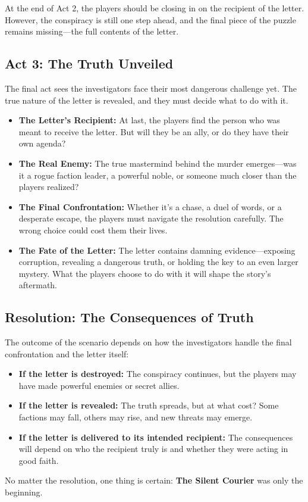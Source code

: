 \noindent
At the end of Act 2, the players should be closing in on the recipient of the letter. However, the conspiracy is still one step ahead, and the final piece of the puzzle remains missing—the full contents of the letter.

\subsection{Act 3: The Truth Unveiled}  
The final act sees the investigators face their most dangerous challenge yet. The true nature of the letter is revealed, and they must decide what to do with it.

\begin{WyrdExplanation}
    \begin{itemize}
        \item \textbf{The Letter’s Recipient:} At last, the players find the person who was meant to receive the letter. But will they be an ally, or do they have their own agenda?
        \item \textbf{The Real Enemy:} The true mastermind behind the murder emerges—was it a rogue faction leader, a powerful noble, or someone much closer than the players realized?
        \item \textbf{The Final Confrontation:} Whether it’s a chase, a duel of words, or a desperate escape, the players must navigate the resolution carefully. The wrong choice could cost them their lives.
        \item \textbf{The Fate of the Letter:} The letter contains damning evidence—exposing corruption, revealing a dangerous truth, or holding the key to an even larger mystery. What the players choose to do with it will shape the story’s aftermath.
    \end{itemize}
\end{WyrdExplanation}

\subsection{Resolution: The Consequences of Truth}  
The outcome of the scenario depends on how the investigators handle the final confrontation and the letter itself:

\begin{itemize}
    \item \textbf{If the letter is destroyed:} The conspiracy continues, but the players may have made powerful enemies or secret allies.
    \item \textbf{If the letter is revealed:} The truth spreads, but at what cost? Some factions may fall, others may rise, and new threats may emerge.
    \item \textbf{If the letter is delivered to its intended recipient:} The consequences will depend on who the recipient truly is and whether they were acting in good faith.
\end{itemize}

No matter the resolution, one thing is certain: \textbf{The Silent Courier} was only the beginning.